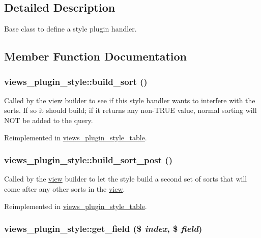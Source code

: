 \subsection{Detailed Description}
Base class to define a style plugin handler. 

\subsection{Member Function Documentation}
\hypertarget{classviews__plugin__style_13b4b43f813fde038a199d2ec26fc76e}{
\subsubsection[{build\_\-sort}]{\setlength{\rightskip}{0pt plus 5cm}views\_\-plugin\_\-style::build\_\-sort ()}}
\label{classviews__plugin__style_13b4b43f813fde038a199d2ec26fc76e}


Called by the \hyperlink{classview}{view} builder to see if this style handler wants to interfere with the sorts. If so it should build; if it returns any non-TRUE value, normal sorting will NOT be added to the query. 

Reimplemented in \hyperlink{classviews__plugin__style__table_3bc31ba52d980f899307aee2d74bef58}{views\_\-plugin\_\-style\_\-table}.\hypertarget{classviews__plugin__style_f59de962f895ccd0b3adf960b908e0bd}{
\subsubsection[{build\_\-sort\_\-post}]{\setlength{\rightskip}{0pt plus 5cm}views\_\-plugin\_\-style::build\_\-sort\_\-post ()}}
\label{classviews__plugin__style_f59de962f895ccd0b3adf960b908e0bd}


Called by the \hyperlink{classview}{view} builder to let the style build a second set of sorts that will come after any other sorts in the \hyperlink{classview}{view}. 

Reimplemented in \hyperlink{classviews__plugin__style__table_00d9e14ac7f545d47a43af3f9d186382}{views\_\-plugin\_\-style\_\-table}.\hypertarget{classviews__plugin__style_dd1dccbb850840911c335ae09ff266d7}{
\subsubsection[{get\_\-field}]{\setlength{\rightskip}{0pt plus 5cm}views\_\-plugin\_\-style::get\_\-field (\$ {\em index}, \/  \$ {\em field})}}
\label{classviews__plugin__style_dd1dccbb850840911c335ae09ff266d7}



